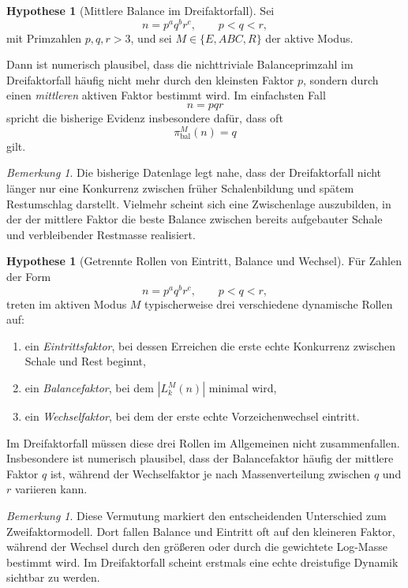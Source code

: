 \documentclass[11pt,a4paper]{article}
\theoremstyle{definition}
\newtheorem{hypothese}[satz]{Hypothese}
\theoremstyle{remark}
\newtheorem{bemerkung}[satz]{Bemerkung}
\begin{document}
	\begin{hypothese}[Mittlere Balance im Dreifaktorfall]
		\label{hyp:dreifaktor_balance_mitte}
		Sei
		\[
		n=p^a q^b r^c,\qquad p<q<r,
		\]
		mit Primzahlen \(p,q,r>3\), und sei \(M\in\{E,ABC,R\}\) der aktive Modus.
		
		Dann ist numerisch plausibel, dass die nichttriviale Balanceprimzahl im Dreifaktorfall
		häufig nicht mehr durch den kleinsten Faktor \(p\), sondern durch einen \emph{mittleren}
		aktiven Faktor bestimmt wird. Im einfachsten Fall
		\[
		n=pqr
		\]
		spricht die bisherige Evidenz insbesondere dafür, dass oft
		\[
		\pi_{\mathrm{bal}}^{M}(n)=q
		\]
		gilt.
	\end{hypothese}
	
	\begin{bemerkung}
		Die bisherige Datenlage legt nahe, dass der Dreifaktorfall nicht länger nur eine
		Konkurrenz zwischen früher Schalenbildung und spätem Restumschlag darstellt. Vielmehr
		scheint sich eine Zwischenlage auszubilden, in der der mittlere Faktor die beste Balance
		zwischen bereits aufgebauter Schale und verbleibender Restmasse realisiert.
	\end{bemerkung}
	
	\begin{hypothese}[Getrennte Rollen von Eintritt, Balance und Wechsel]
		\label{hyp:dreifaktor_rollentrennung}
		Für Zahlen der Form
		\[
		n=p^a q^b r^c,\qquad p<q<r,
		\]
		treten im aktiven Modus \(M\) typischerweise drei verschiedene dynamische Rollen auf:
		
		\begin{enumerate}
			\item ein \emph{Eintrittsfaktor}, bei dessen Erreichen die erste echte Konkurrenz zwischen
			Schale und Rest beginnt,
			\item ein \emph{Balancefaktor}, bei dem \(|L_k^M(n)|\) minimal wird,
			\item ein \emph{Wechselfaktor}, bei dem der erste echte Vorzeichenwechsel eintritt.
		\end{enumerate}
		
		Im Dreifaktorfall müssen diese drei Rollen im Allgemeinen nicht zusammenfallen.
		Insbesondere ist numerisch plausibel, dass der Balancefaktor häufig der mittlere Faktor
		\(q\) ist, während der Wechselfaktor je nach Massenverteilung zwischen \(q\) und \(r\)
		variieren kann.
	\end{hypothese}
	
	\begin{bemerkung}
		Diese Vermutung markiert den entscheidenden Unterschied zum Zweifaktormodell. Dort fallen
		Balance und Eintritt oft auf den kleineren Faktor, während der Wechsel durch den größeren
		oder durch die gewichtete Log-Masse bestimmt wird. Im Dreifaktorfall scheint erstmals eine
		echte dreistufige Dynamik sichtbar zu werden.
	\end{bemerkung}
	
\end{document}
